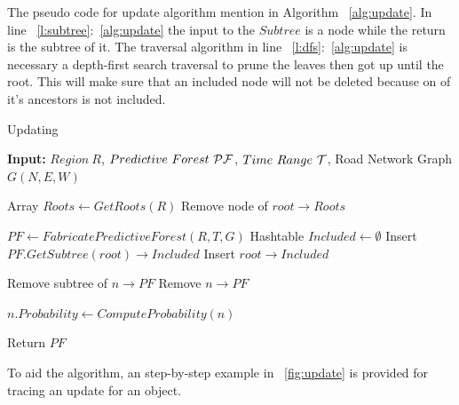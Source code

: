 The pseudo code for \pf update algorithm mention in Algorithm ~\ref{alg:update}. In line ~\ref{l:subtree}:~\ref{alg:update} the input to the $Subtree$ is a node while the return is the subtree of it. The traversal algorithm in line ~\ref{l:dfs}:~\ref{alg:update} is necessary a depth-first search traversal to prune the leaves then got up until the root. This will make sure that an included node will not be deleted because on of it's ancestors is not included.

\begin{algorithm} [ht]
\caption{Updating \PF}
\label{alg:update}
\begin{footnotesize}
\textbf{Input:} $Region~R$, $Predictive~Forest~\cal PF$, $Time~Range~\cal T$, Road Network Graph $G(N,E,W)$
\begin{algorithmic}[1]
\STATE {}
\STATE Array $Roots \leftarrow GetRoots(R)$
        \STATE Remove node of $root \rightarrow Roots$
    \ENDIF
\ENDFOR

    \STATE $PF \leftarrow FabricatePredictiveForest(R, T, G)$
\ELSE
    \STATE {}
    \STATE Hashtable $Included \leftarrow \emptyset$
    \STATE Insert $PF.GetSubtree(root) \rightarrow Included$ \label{l:subtree}
    \STATE Insert $root \rightarrow Included$
    \ENDFOR

\STATE {}
 \label{l:dfs}
    \STATE Remove subtree of $n \rightarrow PF$
    \STATE Remove $n \rightarrow PF$
\ENDIF
\ENDFOR

    \STATE $n.Probability \leftarrow ComputeProbability(n)$
\ENDFOR

\ENDIF

\STATE Return $PF$
\end{algorithmic}
\end{footnotesize}
\end{algorithm}

To aid the algorithm, an step-by-step example in ~\ref{fig:update} is provided for tracing an \pf update for an object.


